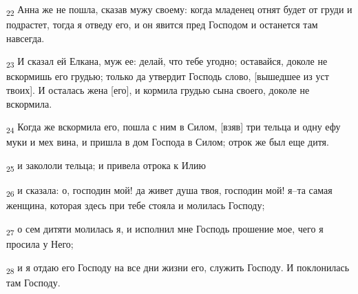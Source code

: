 \begin{tcolorbox}
\textsubscript{22} Анна же не пошла, сказав мужу своему: когда младенец отнят будет от груди и подрастет, тогда я отведу его, и он явится пред Господом и останется там навсегда.
\end{tcolorbox}
\begin{tcolorbox}
\textsubscript{23} И сказал ей Елкана, муж ее: делай, что тебе угодно; оставайся, доколе не вскормишь его грудью; только да утвердит Господь слово, [вышедшее из уст твоих]. И осталась жена [его], и кормила грудью сына своего, доколе не вскормила.
\end{tcolorbox}
\begin{tcolorbox}
\textsubscript{24} Когда же вскормила его, пошла с ним в Силом, [взяв] три тельца и одну ефу муки и мех вина, и пришла в дом Господа в Силом; отрок же был еще дитя.
\end{tcolorbox}
\begin{tcolorbox}
\textsubscript{25} и закололи тельца; и привела отрока к Илию
\end{tcolorbox}
\begin{tcolorbox}
\textsubscript{26} и сказала: о, господин мой! да живет душа твоя, господин мой! я--та самая женщина, которая здесь при тебе стояла и молилась Господу;
\end{tcolorbox}
\begin{tcolorbox}
\textsubscript{27} о сем дитяти молилась я, и исполнил мне Господь прошение мое, чего я просила у Него;
\end{tcolorbox}
\begin{tcolorbox}
\textsubscript{28} и я отдаю его Господу на все дни жизни его, служить Господу. И поклонилась там Господу.
\end{tcolorbox}
